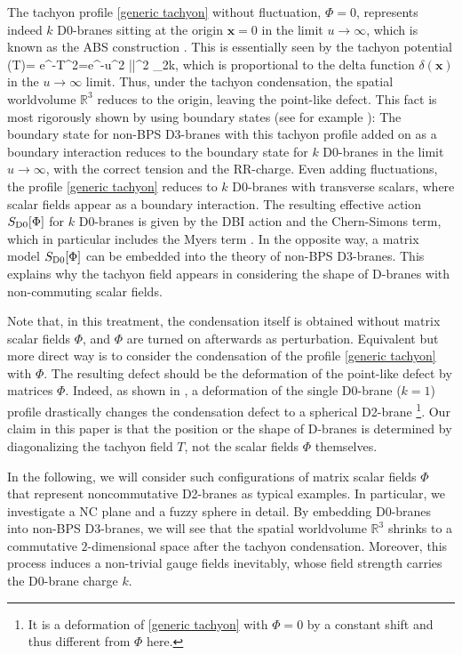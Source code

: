 \documentclass[12pt]{article}
\numberwithin{equation}{section}
\def\real{\mathbb{R}}
\def\bea#1\ena{\begin{align}#1\end{align}}
\begin{document}
The tachyon profile \eqref{generic tachyon} without fluctuation, $\Phi=0$, 
represents indeed $k$ D0-branes sitting at the origin $\boldsymbol{x}=0$ in the limit $u\to \infty$, 
which is known as the ABS construction {\cite{Atiyah1964, Witten1998}}.
This is essentially seen by the tachyon potential
\bea
V(T)= e^{-T^2}=e^{-u^2 ||^2} \otimes  {}_{2k},
\ena 
which is proportional to the delta function $\delta(\boldsymbol{x})$ in the $u\to \infty$ limit.
Thus, under the tachyon condensation, the spatial worldvolume $\real^3$ reduces to 
the origin, leaving the point-like defect.
This fact is most rigorously shown by using boundary states 
(see for example {\cite{Asakawa2003}}):
The boundary state for non-BPS D3-branes with this tachyon profile added on as a boundary 
interaction reduces to the boundary state for $k$ D0-branes in the limit $u\to \infty$, 
with the correct tension and the RR-charge.
Even adding fluctuations, the profile \eqref{generic tachyon} 
reduces to $k$ D0-branes with transverse scalars,
where scalar fields appear as a boundary interaction.
The resulting effective action $S_{\rm D0}[\Phi]$ for $k$ D0-branes is given by the DBI action and the Chern-Simons term, 
{which in particular includes the Myers term \cite{Myers1999}.}
In the opposite way, a matrix model $S_{\rm D0}[\Phi]$ can be embedded into the theory of non-BPS D3-branes.
This explains why the tachyon field appears in considering 
the shape of D-branes with non-commuting scalar fields.

Note that, in this treatment, the condensation itself is obtained without matrix scalar fields $\Phi$,
and $\Phi$ are turned on afterwards as perturbation.
Equivalent but more direct way is to consider the condensation of the profile 
\eqref{generic tachyon} with $\Phi$.
The resulting defect should be the deformation of the point-like defect by matrices $\Phi$.
Indeed, as shown in \cite{Asakawa2017}, a deformation of the single 
D0-brane ($k=1$) profile drastically changes the condensation defect 
to a spherical D2-brane%
\footnote{It is a deformation of \eqref{generic tachyon} with $\Phi=0$ by a constant shift 
and thus different from $\Phi$ here.}.
Our claim in this paper is that the position or the shape of 
{D-branes} is 
determined by diagonalizing the tachyon field $T${,} %
not the scalar fields $\Phi$ themselves. %

In the following, we will consider such configurations of matrix scalar fields $\Phi$ that represent noncommutative D2-branes as typical examples. In particular, we investigate a NC plane and a fuzzy sphere in detail.
By embedding D0-branes into non-BPS D3-branes,
we will see that the spatial worldvolume $\real^3$ shrinks 
to a commutative $2$-dimensional space after the tachyon condensation.
Moreover, this process induces a non-trivial gauge fields inevitably, 
whose field strength carries the D0-brane charge $k$.
\end{document}
